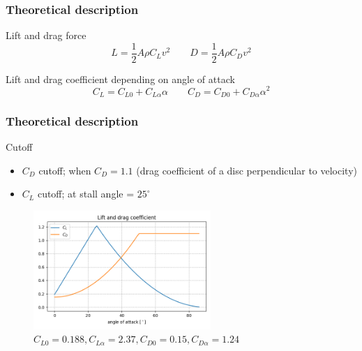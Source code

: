 \documentclass{beamer}
\begin{document}

\begin{frame}

\frametitle{Theoretical description}

\begin{block}{Lift and drag force}
\begin{equation}
L = \dfrac{1}{2} A \rho C_L v^2 \qquad D = \dfrac{1}{2} A \rho C_D v^2
\end{equation}
\end{block}

\begin{block}{Lift and drag coefficient depending on angle of attack \cite{clanek}}
\begin{equation}
C_L = C_{L0} + C_{L \alpha} \alpha \qquad C_D = C_{D0} + C_{D \alpha} \alpha^2
\end{equation}
\end{block}

\end{frame}


\begin{frame}

\frametitle{Theoretical description}

\begin{block}{Cutoff}
\begin{itemize}
\item $C_D$ cutoff; when $C_D = 1.1$ (drag coefficient of a disc perpendicular to velocity)

\item $C_L$ cutoff; at stall angle = $25^{\circ}$
\end{itemize}
\end{block}

\begin{figure}[H]
	\centering	  \includegraphics[width=0.6\textwidth]{lift_drag_primer.png}
	  \caption{$C_{L0} = 0.188, C_{L \alpha}= 2.37, C_{D0} = 0.15, C_{D \alpha} = 1.24$ \cite{clanek}}
\end{figure}

\end{frame}
\end{document}
